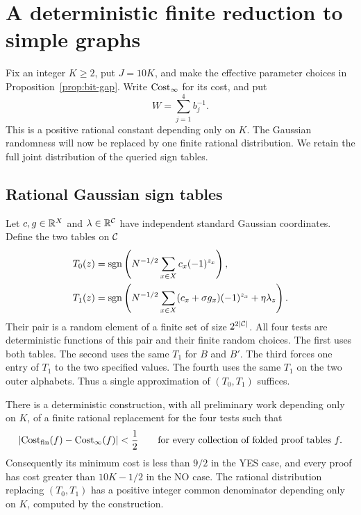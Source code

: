 \section{A deterministic finite reduction to simple graphs}
\label{sec:finite}

Fix an integer $K\ge2$, put $J=10K$, and make the effective parameter
choices in Proposition~\ref{prop:bit-gap}. Write $\operatorname{Cost}_\infty$ for its
cost, and put
\[
 W=\sum_{j=1}^4 b_j^{-1}.
\]
This is a positive rational constant depending only on $K$. The Gaussian
randomness will now be replaced by one finite rational distribution. We
retain the full joint distribution of the queried sign tables.

\subsection{Rational Gaussian sign tables}

Let $c,g\in\mathbb R^X$ and $\lambda\in\mathbb R^{\mathcal C}$ have independent standard
Gaussian coordinates. Define the two tables on $\mathcal C$
\begin{align*}
 T_0(z)&=\operatorname{sgn}\left(N^{-1/2}\sum_{x\in X}c_x(-1)^{z_x}\right),\\
 T_1(z)&=\operatorname{sgn}\left(N^{-1/2}\sum_{x\in X}(c_x+\sigma g_x)(-1)^{z_x}
                         +\eta\lambda_z\right).
\end{align*}
Their pair is a random element of a finite set of size
$2^{2|\mathcal C|}$. All four tests are deterministic functions of this pair and
their finite random choices. The first uses both tables. The second uses
the same $T_1$ for $B$ and $B'$. The third forces one entry of $T_1$ to the
two specified values. The fourth uses the same $T_1$ on the two outer
alphabets. Thus a single approximation of $(T_0,T_1)$ suffices.

\begin{lemma}\label{lem:finite-game}
There is a deterministic construction, with all preliminary work depending
only on $K$, of a finite rational replacement for the four tests such that
\begin{equation}\label{eq:uniform-finite-error}
 \lvert\operatorname{Cost}_{\mathrm{fin}}(f)-\operatorname{Cost}_\infty(f)\rvert<\frac12
 \qquad\text{for every collection of folded proof tables }f.
\end{equation}
Consequently its minimum cost is less than $9/2$ in the YES case, and every
proof has cost greater than $10K-1/2$ in the NO case. The rational
distribution replacing $(T_0,T_1)$ has a positive integer common
denominator depending only on $K$, computed by the construction.
\end{lemma}

